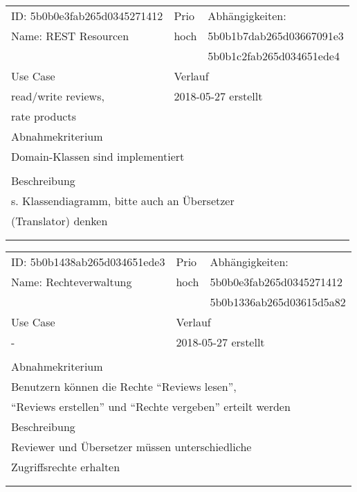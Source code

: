 \documentclass{article}
\begin{document}
\resizebox{10cm}{!} {
\begin{tabular}{lllll}
  \hline
  \multicolumn{2}{|l|}{\tiny{ID: 5b0b0e3fab265d0345271412}} & Prio & \multicolumn{2}{|l|}{Abhängigkeiten:} \\
  \multicolumn{2}{|l|}{Name: REST Resourcen} & hoch & \multicolumn{2}{|l|}{\tiny{5b0b1b7dab265d03667091e3}} \\
  \multicolumn{2}{|l|}{} &  & \multicolumn{2}{|l|}{\tiny{5b0b1c2fab265d034651ede4}} \\
  \hline
  \multicolumn{2}{|l|}{Use Case} & \multicolumn{3}{|l|}{Verlauf} \\
  \multicolumn{2}{|l|}{read/write reviews,} & \multicolumn{3}{|l|}{2018-05-27 erstellt} \\
  \multicolumn{2}{|l|}{rate products} & \multicolumn{3}{|l|}{} \\
  \hline
  \multicolumn{5}{|l|}{Abnahmekriterium} \\
  \multicolumn{5}{|l|}{Domain-Klassen sind implementiert} \\
  \multicolumn{5}{|l|}{} \\
  \hline
  \multicolumn{5}{|l|}{Beschreibung} \\
  \multicolumn{5}{|l|}{s. Klassendiagramm, bitte auch an Übersetzer} \\
  \multicolumn{5}{|l|}{(Translator) denken} \\
  \multicolumn{5}{|l|}{} \\
  \multicolumn{5}{|l|}{} \\
  \hline
\end{tabular}
}
\vfill
\resizebox{10cm}{!} {
\begin{tabular}{lllll}
  \hline
  \multicolumn{2}{|l|}{\tiny{ID: 5b0b1438ab265d034651ede3}} & Prio & \multicolumn{2}{|l|}{Abhängigkeiten:} \\
  \multicolumn{2}{|l|}{Name: Rechteverwaltung} & hoch & \multicolumn{2}{|l|}{\tiny{5b0b0e3fab265d0345271412}} \\
  \multicolumn{2}{|l|}{} &  & \multicolumn{2}{|l|}{\tiny{5b0b1336ab265d03615d5a82}} \\
  \hline
  \multicolumn{2}{|l|}{Use Case} & \multicolumn{3}{|l|}{Verlauf} \\
  \multicolumn{2}{|l|}{-} & \multicolumn{3}{|l|}{2018-05-27 erstellt} \\
  \multicolumn{2}{|l|}{} & \multicolumn{3}{|l|}{} \\
  \hline
  \multicolumn{5}{|l|}{Abnahmekriterium} \\
  \multicolumn{5}{|l|}{Benutzern können die Rechte ``Reviews lesen'',} \\
  \multicolumn{5}{|l|}{ ``Reviews erstellen'' und ``Rechte vergeben'' erteilt werden} \\
  \hline
  \multicolumn{5}{|l|}{Beschreibung} \\
  \multicolumn{5}{|l|}{Reviewer und Übersetzer müssen unterschiedliche} \\
  \multicolumn{5}{|l|}{Zugriffsrechte erhalten} \\
  \multicolumn{5}{|l|}{} \\
  \multicolumn{5}{|l|}{} \\
  \hline
\end{tabular}
}
\end{document}
